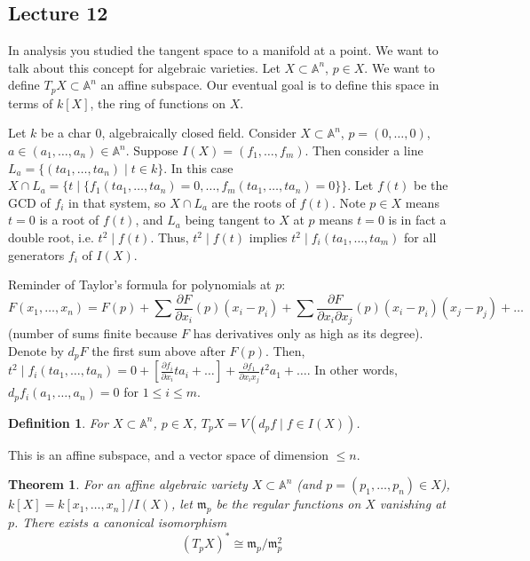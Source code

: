 \documentclass[12pt]{article}
\newcommand{\A}{\mathbb{A}}
\newcommand{\m}{\mathfrak{m}}
\newtheorem{definition}{Definition}[section]
\newtheorem{theorem}{Theorem}[section]
\begin{document}
    \subsection{Lecture 12}
    In analysis you studied the tangent space to a manifold at a point. We want to talk about this concept for algebraic varieties. Let $X \subset \A^n$, $p \in X$. We want to define $T_pX \subset \A^n$ an affine subspace. Our eventual goal is to define this space in terms of $k[X]$, the ring of functions on $X$. \par 
    Let $k$ be a char 0, algebraically closed field. Consider $X \subset \A^n$, $p = (0, \dots, 0)$, $a \in (a_1, \dots, a_n) \in \A^n$. Suppose $I(X) = (f_1, \dots, f_m)$. Then consider a line $L_a = \{(ta_1, \dots, ta_n) \mid t \in k\}$. In this case $X \cap L_a = \{t \mid \{f_1(ta_1, \dots, ta_n) = 0, \dots, f_m(ta_1, \dots, ta_n) = 0\}\}$. Let $f(t)$ be the GCD of $f_i$ in that system, so $X \cap L_a$ are the roots of $f(t)$. Note $p \in X$ means $t = 0$ is a root of $f(t)$, and $L_a$ being tangent to $X$ at $p$ means $t = 0$ is in fact a double root, i.e. $t^2 \mid f(t)$.  Thus, $t^2\mid f(t)$ implies $t^2 \mid f_i(ta_1,\dots, ta_m)$ for all generators $f_i$ of $I(X)$. \par
    Reminder of Taylor's formula for polynomials at $p$:
    $$F(x_1, \dots, x_n) = F(p) + \sum \frac{\partial F}{\partial x_i}(p)(x_i - p_i) + \sum\frac{\partial F}{\partial x_i \partial x_j}(p) (x_i - p_i)(x_j - p_j) + \dots $$
    (number of sums finite because $F$ has derivatives only as high as its degree). Denote by $d_pF$ the first sum above after $F(p)$. Then, $t^2 \mid f_i(ta_1, \dots, ta_n) = 0 + [\frac{\partial f_i}{\partial x_i}ta_i + \dots] + \frac{\partial f_1}{\partial x_i x_j}t^2 a_1 + \dots$. In other words, $d_pf_i(a_1, \dots, a_n) = 0$ for $1 \leq i \leq m$. 
    \begin{definition}
        For $X \subset \A^n$, $p \in X$, $T_pX = V(d_pf \mid f \in I(X))$.
    \end{definition} 
    This is an affine subspace, and a vector space of dimension $\leq n$.
    \begin{theorem}
        For an affine algebraic variety $X \subset \A^n$ (and $p = (p_1, \dots, p_n) \in X$), $k[X] = k[x_1, \dots, x_n]/I(X)$, let $\mathfrak{m}_p$ be the regular functions on $X$ vanishing at $p$. There exists a canonical isomorphism 
        $$(T_pX)^* \cong \m_p/\m_p^2$$
    \end{theorem} 
\end{document}
